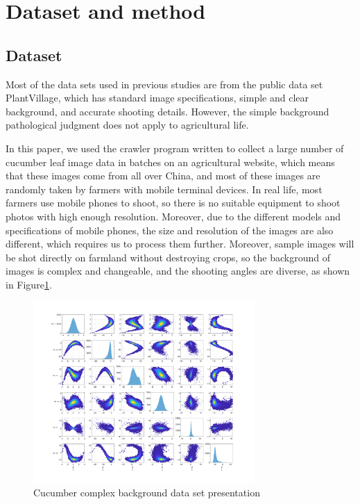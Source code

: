 \documentclass[a4paper,fleqn]{cas-sc}
\begin{document}
\section{Dataset and method}

\subsection{Dataset}
Most of the data sets used in previous studies are from the public data set PlantVillage, which has standard image specifications, simple and clear background, and accurate shooting details. However, the simple background pathological judgment does not apply to agricultural life.

In this paper, we used the crawler program written to collect a large number of cucumber leaf image data in batches on an agricultural website, which means that these images come from all over China, and most of these images are randomly taken by farmers with mobile terminal devices. In real life, most farmers use mobile phones to shoot, so there is no suitable equipment to shoot photos with high enough resolution. Moreover, due to the different models and specifications of mobile phones, the size and resolution of the images are also different, which requires us to process them further. Moreover, sample images will be shot directly on farmland without destroying crops, so the background of images is complex and changeable, and the shooting angles are diverse, as shown in Figure\ref{fig:f1}.
\begin{figure}
\centering
\includegraphics[width=0.75\textwidth]{figs/f1.png}
\caption{Cucumber complex background data set presentation}
\label{fig:f1}
\end{figure}
\end{document}
